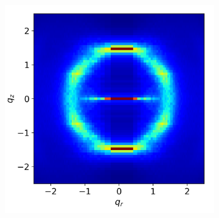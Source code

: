 \documentclass[journal=jpcbfk,manusciprt=article]{achemso}
\begin{document}
\begin{figure}
\begin{subfigure}{0.3\linewidth}
        \caption{}~\label{fig:raw_waxs}
  \end{subfigure}
  \begin{subfigure}{0.3\linewidth}
        \centering
        \includegraphics[width=\linewidth]{layered_rzplot.png}
        \caption{}~\label{fig:rz_layered}
  \end{subfigure}
  \begin{subfigure}{0.0544\linewidth}
        \centering
        \vspace{-4.00em}

\end{subfigure}
\end{figure}
\end{document}
